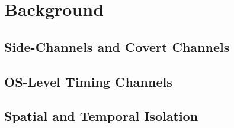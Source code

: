 \section{Background}
\label{sec:background}


\subsection{Side-Channels and Covert Channels}
\label{sub:channels}


\subsection{OS-Level Timing Channels}
\label{sub:timing_channels}


\subsection{Spatial and Temporal Isolation}
\label{sub:isolation}

